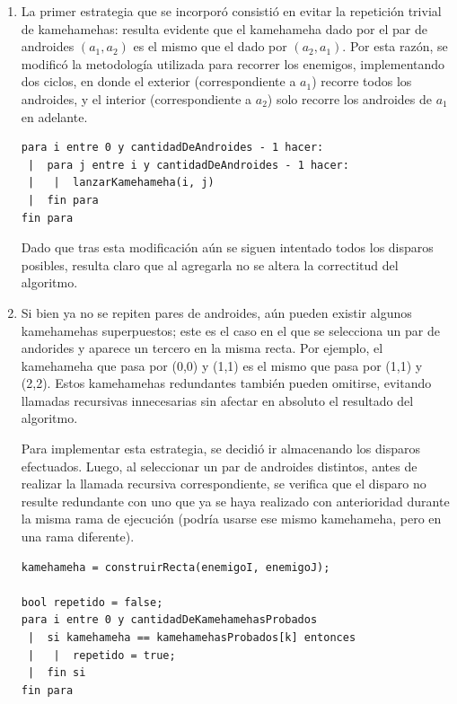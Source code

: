     \begin{enumerate}
        \item La primer estrategia que se incorporó consistió en evitar la repetición trivial de kamehamehas: resulta evidente que el kamehameha dado por el par de androides $(a_1, a_2)$ es el mismo que el dado por $(a_2, a_1)$. Por esta razón, se modificó la metodología utilizada para recorrer los enemigos, implementando dos ciclos, en donde el exterior (correspondiente a $a_1$) recorre todos los androides, y el interior (correspondiente a $a_2$) solo recorre los androides de $a_1$ en adelante.

        \begin{codesnippet}
        \begin{verbatim}
para i entre 0 y cantidadDeAndroides - 1 hacer:
 |  para j entre i y cantidadDeAndroides - 1 hacer:
 |   |  lanzarKamehameha(i, j)
 |  fin para
fin para
        \end{verbatim}
        \end{codesnippet}

        Dado que tras esta modificación aún se siguen intentado todos los disparos posibles, resulta claro que al agregarla no se altera la correctitud del algoritmo.

        \item Si bien ya no se repiten pares de androides, aún pueden existir algunos kamehamehas superpuestos; este es el caso en el que se selecciona un par de andorides y aparece un tercero en la misma recta. Por ejemplo, el kamehameha que pasa por (0,0) y (1,1) es el mismo que pasa por (1,1) y (2,2). Estos kamehamehas redundantes también pueden omitirse, evitando llamadas recursivas innecesarias sin afectar en absoluto el resultado del algoritmo.

        Para implementar esta estrategia, se decidió ir almacenando los disparos efectuados. Luego, al seleccionar un par de androides distintos, antes de realizar la llamada recursiva correspondiente, se verifica que el disparo no resulte redundante con uno que ya se haya realizado con anterioridad durante la misma rama de ejecución (podría usarse ese mismo kamehameha, pero en una rama diferente).

        \begin{codesnippet}
        \begin{verbatim}
kamehameha = construirRecta(enemigoI, enemigoJ);

bool repetido = false;
para i entre 0 y cantidadDeKamehamehasProbados
 |  si kamehameha == kamehamehasProbados[k] entonces
 |   |  repetido = true;
 |  fin si
fin para


\end{verbatim}
\end{codesnippet}
\end{enumerate}
